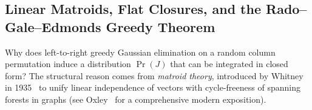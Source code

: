 \documentclass[12pt]{article}
\theoremstyle{definition}
\begin{document}
\subsection{Linear Matroids, Flat Closures, and the Rado\texorpdfstring{--}{-}Gale\texorpdfstring{--}{-}Edmonds
  Greedy Theorem}\label{subsec:matroids}

Why does left-to-right greedy Gaussian elimination on a random column permutation induce a distribution $\Pr(J)$
that can be integrated in closed form? The structural reason comes from \emph{matroid theory}, introduced by
Whitney in 1935~\cite{Whitney1935} to unify linear independence of vectors with cycle-freeness of spanning forests
in graphs (see Oxley~\cite{Oxley2011} for a comprehensive modern exposition).
\end{document}
